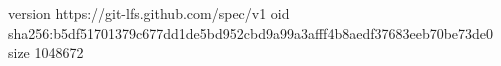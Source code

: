 version https://git-lfs.github.com/spec/v1
oid sha256:b5df51701379c677dd1de5bd952cbd9a99a3afff4b8aedf37683eeb70be73de0
size 1048672
